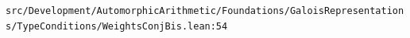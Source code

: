 \nolinkurl{src/Development/AutomorphicArithmetic/Foundations/GaloisRepresentations/TypeConditions/WeightsConjBis.lean:54}%
